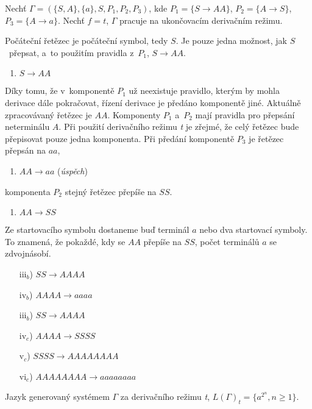 \begin{example}
    Nechť $\Gamma = (\{S, A\}, \{a\}, S, P_1, P_2, P_3)$, kde $P_1 = \{S \rightarrow AA\}$, $P_2 = \{A \rightarrow S\}$, $P_3 = \{A \rightarrow a\}$.
    Nechť $f = t$, $\Gamma$ pracuje na ukončovacím derivačním režimu.

    Počáteční řetězec je počáteční symbol, tedy $S$. 
    Je pouze jedna možnost, jak $S$~přepsat, a~to použitím pravidla z~$P_1$, $S \rightarrow AA$.
    \begin{enumerate}[label=i)]
        \centering
        \item $S \rightarrow AA$
    \end{enumerate}
    Díky tomu, že v~komponentě $P_1$ už neexistuje pravidlo, kterým by mohla derivace dále pokračovat, řízení derivace je předáno komponentě jiné.
    Aktuálně zpracovávaný řetězec je $AA$.
    Komponenty $P_1$ a~$P_2$ mají pravidla pro přepsání neterminálu $A$.
    Při použití derivačního režimu \emph{t} je zřejmé, že celý řetězec bude přepisovat pouze jedna komponenta.
    Při předání komponentě $P_3$ je řetězec přepsán na $aa$,
    \begin{enumerate}[label=ii$_a$)]
        \centering
        \item $AA \rightarrow aa$ (\emph{úspěch})
    \end{enumerate}
    komponenta $P_2$ stejný řetězec přepíše na $SS$.
    \begin{enumerate}[label=ii$_b$)]
        \centering
        \item $AA \rightarrow SS$
    \end{enumerate}
    Ze startovacího symbolu dostaneme buď terminál $a$ nebo dva startovací symboly.
    To znamená, že pokaždé, kdy se $AA$ přepíše na $SS$, počet terminálů $a$ se zdvojnásobí.
    \begin{center}
        \begin{minipage}[h]{0.4\textwidth}
            \begin{enumerate}
                \item[iii$_b$)] $SS \rightarrow AAAA$
                \item[iv$_b$)] $AAAA \rightarrow aaaa$
            \end{enumerate}
        \end{minipage}%
        \begin{minipage}[h]{0.4\textwidth}
            \begin{enumerate}
                \item[iii$_b$)] $SS \rightarrow AAAA$
                \item[iv$_c$)] $AAAA \rightarrow SSSS$
                \item[v$_c$)] $SSSS \rightarrow AAAAAAAA$
                \item[vi$_c$)] $AAAAAAAA \rightarrow aaaaaaaa$ 
            \end{enumerate}
        \end{minipage}%
    \end{center}
    Jazyk generovaný systémem $\Gamma$ za derivačního režimu \emph{t}, $L(\Gamma)_t = \{a^{2^n}, n \geq 1 \}$.
\end{example}

